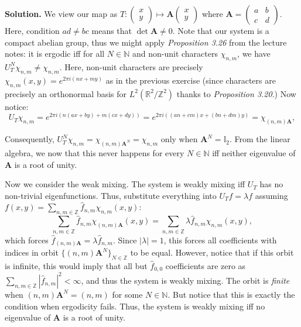 \documentclass{template}
\begin{document}
\textbf{Solution.} We view our map as $T: \begin{pmatrix} x \\ y \end{pmatrix}
\mapsto \mathbf{A}\begin{pmatrix} x \\ y \end{pmatrix}$ where $\mathbf{A} =
\begin{pmatrix} a & b \\ c & d \end{pmatrix}$. Here, condition $ad \neq bc$
means that $\det \mathbf{A} \neq 0$. Note that our system is a compact abelian
group, thus we might apply \textit{Proposition 3.26} from the lecture notes: it
is ergodic iff for all $N \in \mathbb{N}$ and non-unit characters $\chi_{n,m}$,
we have $U_T^N\chi_{n,m} \neq \chi_{n,m}$. Here, non-unit characters are
precisely $\chi_{n,m}(x,y) = e^{2\pi i(nx+my)}$ as in the previous exercise
(since characters are precisely an orthonormal basis for
$L^2(\mathbb{R}^2/\mathbb{Z}^2)$ thanks to \textit{Proposition 3.20}.) Now
notice:
\begin{equation*}
    U_T\chi_{n,m} = e^{2\pi i(n(ax+by)+m(cx+dy))} = e^{2\pi i((an+cm)x+(bn+dm)y)} = \chi_{(n,m)\mathbf{A}},
\end{equation*}

Consequently, $U_T^N\chi_{n,m}=\chi_{(n,m)\mathbf{A}^N}=\chi_{n,m}$ only when
$\mathbf{A}^N = \mathbb{I}_2$. From the linear algebra, we now that this 
never happens for every $N \in \mathbb{N}$ iff neither eigenvalue of $\mathbf{A}$
is a root of unity.

Now we consider the weak mixing. The system is weakly mixing iff $U_T$ has 
no non-trivial eigenfunctions. Thus, substitute everything into $U_Tf=\lambda f$
assuming $f(x,y)=\sum_{n,m \in \mathbb{Z}}\widehat{f}_{n,m}\chi_{n,m}(x,y)$:
\begin{equation*}
    \sum_{n,m \in \mathbb{Z}}\widehat{f}_{n,m}\chi_{(n,m)\mathbf{A}}(x,y) = \sum_{n,m \in \mathbb{Z}}\lambda\widehat{f}_{n,m}\chi_{n,m}(x,y),
\end{equation*}
which forces $\widehat{f}_{(n,m)\mathbf{A}} = \lambda \widehat{f}_{n,m}$. Since
$|\lambda|=1$, this forces all coefficients with indices in orbit
$\{(n,m)\mathbf{A}^N\}_{N \in \mathbb{Z}}$ to be equal. However, notice that if
this orbit is infinite, this would imply that all but $\widehat{f}_{0,0}$
coefficients are zero as $\sum_{n,m \in \mathbb{Z}}|\widehat{f}_{n,m}|^2 <
\infty$, and thus the system is weakly mixing. The orbit is \textit{finite}
when $(n,m)\mathbf{A}^N = (n,m)$ for some $N \in \mathbb{N}$. But notice that 
this is exactly the condition when ergodicity fails. Thus, the system is 
weakly mixing iff no eigenvalue of $\mathbf{A}$ is a root of unity.
\end{document}
